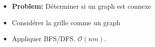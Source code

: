 \begin{frame}
    \frametitle{\problemtitle}
    \begin{itemize}
        \item<+-> \textbf{Problem:} Déterminer si un graph est connexe
        \item<+-> Considérer la grille comme un graph
        \item<+-> Appliquer BFS/DFS. $\mathcal O(nm)$.
    \end{itemize}
\end{frame}

